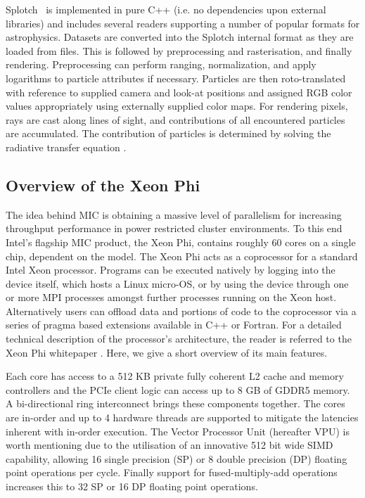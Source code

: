 \documentclass[runningheads,a4paper]{llncs}
\begin{document}
Splotch~\cite{splotch} is implemented in pure C++ (i.e. no dependencies upon external libraries) and includes several readers 
supporting a number of popular formats for astrophysics. Datasets are converted into the Splotch internal format as they are 
loaded from files. This is followed by preprocessing and rasterisation, and finally rendering. 
Preprocessing can perform ranging, normalization, 
and apply logarithms to particle attributes if necessary. Particles are then roto-translated with reference to supplied 
camera and look-at positions and assigned RGB color values appropriately using externally supplied color maps. For rendering 
pixels, rays are cast along lines of sight, and contributions of all encountered particles are accumulated. The contribution 
of particles is determined by solving the radiative transfer equation \cite{splotchgpu}.

\subsection{Overview of the Xeon Phi}
\label{sect:micoverview}

The idea behind MIC is obtaining a massive level of parallelism for increasing throughput performance in power restricted cluster 
environments. To this end Intel's flagship MIC product, the Xeon Phi, contains roughly 60 cores on a single chip, dependent on the 
model. The Xeon Phi acts as a coprocessor for a standard Intel Xeon processor. Programs can be executed natively by logging into 
the device itself, which hosts a Linux micro-OS, or by using the device through one or more MPI processes amongst further processes 
running on the Xeon host. Alternatively users can offload data and portions of code to the coprocessor via a series of pragma 
based extensions available in C++ or Fortran.
For a detailed technical description of the processor's architecture, the reader is referred to the
Xeon Phi whitepaper \cite{xeonphi}. Here, we give a short overview of its main features.

Each core has access to a 512 KB private fully coherent L2 cache and memory controllers
and the PCIe client logic can access up to 8 GB of GDDR5 memory. A bi-directional ring interconnect
brings these components together. The cores are in-order and up to 4 hardware threads are supported to mitigate
the latencies inherent with in-order execution. The Vector Processor Unit (hereafter VPU) is worth mentioning due to
the utilisation of an innovative 512 bit wide SIMD capability, allowing 16 single precision (SP) or 8 double precision
(DP) floating point operations per cycle. Finally support for fused-multiply-add operations increases this to 32 SP or 16 DP
floating point operations.
\end{document}
